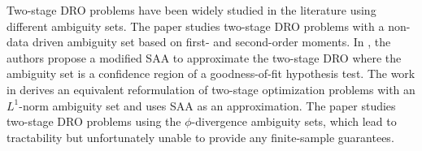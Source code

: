 \documentclass{article}
\begin{document}




Two-stage DRO problems have been widely studied in the literature using different ambiguity sets. The paper \cite{DRO-NPhard} studies two-stage DRO problems with a non-data driven ambiguity set based on first- and second-order moments. In  \cite{DRO-solution-2}, the authors propose a modified SAA to approximate the two-stage DRO where the ambiguity set is a confidence region of a goodness-of-fit hypothesis test. The work in \cite{DRO-solution-1} derives an equivalent reformulation of two-stage optimization problems with an $L^{1}$-norm ambiguity set and uses SAA as an approximation. The paper \cite{bayraksan2015data} studies two-stage DRO problems using the $\phi$-divergence ambiguity sets, which lead to tractability but unfortunately unable to provide any finite-sample guarantees. 
\end{document}
